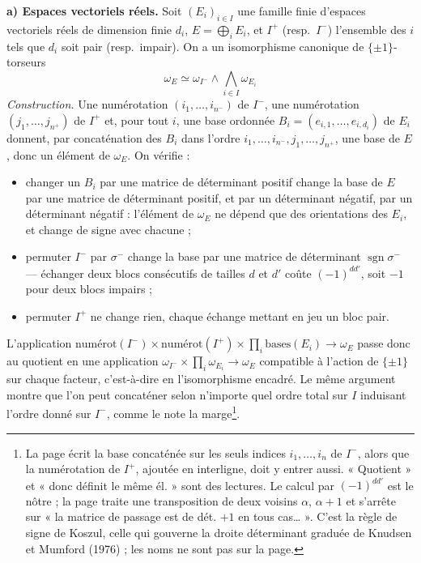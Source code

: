 \documentclass[11pt,a4paper]{article}
\begin{document}
\textbf{a) Espaces vectoriels réels.} Soit $(E_i)_{i \in I}$ une famille finie
d'espaces vectoriels réels de dimension finie $d_i$, $E = \bigoplus_i E_i$, et
$I^{+}$ (resp.\ $I^{-}$) l'ensemble des $i$ tels que $d_i$ soit pair (resp.\
impair). On a un isomorphisme canonique de $\{\pm 1\}$-torseurs
\[
  \boxed{\ \omega_E \simeq \omega_{I^{-}} \wedge \bigwedge_{i \in I} \omega_{E_i}\ }
\]
\emph{Construction.} Une numérotation $(i_1, \ldots, i_{n^-})$ de $I^{-}$, une
numérotation $(j_1, \ldots, j_{n^+})$ de $I^{+}$ et, pour tout $i$, une base
ordonnée $B_i = (e_{i,1}, \ldots, e_{i,d_i})$ de $E_i$ donnent, par
concaténation des $B_i$ dans l'ordre $i_1, \ldots, i_{n^-}, j_1, \ldots,
j_{n^+}$, une base de $E$, donc un élément de $\omega_E$. On vérifie :
\begin{itemize}
\item changer un $B_i$ par une matrice de déterminant positif change la base
de $E$ par une matrice de déterminant positif, et par un déterminant négatif,
par un déterminant négatif : l'élément de $\omega_E$ ne dépend que des
orientations des $E_i$, et change de signe avec chacune ;
\item permuter $I^{-}$ par $\sigma^{-}$ change la base par une matrice de
déterminant $\operatorname{sgn}\sigma^{-}$ --- échanger deux blocs consécutifs
de tailles $d$ et $d'$ coûte $(-1)^{d d'}$, soit $-1$ pour deux blocs
impairs ;
\item permuter $I^{+}$ ne change rien, chaque échange mettant en jeu un bloc
pair.
\end{itemize}
L'application $\mathrm{numérot}(I^-) \times \mathrm{numérot}(I^+) \times
\prod_i \mathrm{bases}(E_i) \to \omega_E$ passe donc au quotient en une
application $\omega_{I^-} \times \prod_i \omega_{E_i} \to \omega_E$ compatible
à l'action de $\{\pm 1\}$ sur chaque facteur, c'est-à-dire en l'isomorphisme
encadré. Le même argument montre que l'on peut concaténer selon n'importe quel
ordre total sur $I$ induisant l'ordre donné sur $I^{-}$, comme le note la
marge\footnote{La page écrit la base concaténée sur les seuls indices $i_1,
\ldots, i_n$ de $I^-$, alors que la numérotation de $I^+$, ajoutée en
interligne, doit y entrer aussi. « Quotient » et « donc définit le même él. »
sont des lectures. Le calcul par $(-1)^{dd'}$ est le nôtre ; la page traite
une transposition de deux voisins $\alpha$, $\alpha + 1$ et s'arrête sur
« la matrice de passage est de dét. $+1$ en tous cas… ». C'est la règle de
signe de Koszul, celle qui gouverne la droite déterminant graduée de Knudsen
et Mumford (1976) ; les noms ne sont pas sur la page.}.
\end{document}
